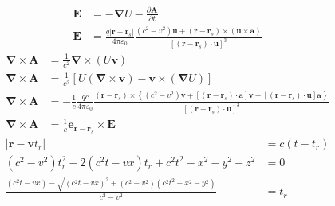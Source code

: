 \begin{align}
    \boldsymbol{E}&=-\boldsymbol{\nabla}U-\frac{\partial\boldsymbol{A}}{\partial t}\nonumber\\
    \boldsymbol{E}&=\frac{q\left|\boldsymbol{r}-\boldsymbol{r}_s\right|}{4\pi\varepsilon_0} \frac{\left(c^2-v^2\right)\boldsymbol{u}+\left(\boldsymbol{r}-\boldsymbol{r}_s\right)\times\left(\boldsymbol{u}\times\boldsymbol{a}\right)}{\left[(\boldsymbol{r}-\boldsymbol{r}_s)\cdot\boldsymbol{u}\right]^3}\label{eq:LW_E_radiation}
\end{align}
\begin{align}
    \boldsymbol{\nabla}\times\boldsymbol{A}&=\frac{1}{c^2}\boldsymbol{\nabla}\times(U\boldsymbol{v})\nonumber\\
    \boldsymbol{\nabla}\times\boldsymbol{A}&=\frac{1}{c^2}\left[U(\boldsymbol{\nabla}\times\boldsymbol{v})-\boldsymbol{v}\times(\boldsymbol{\nabla}U)\right]\nonumber\\
    \boldsymbol{\nabla}\times\boldsymbol{A}&=-\frac{1}{c}\frac{qc}{4\pi\varepsilon_0} \frac{(\boldsymbol{r}-\boldsymbol{r}_s)\times\left\{(c^2-v^2)\boldsymbol{v}+[(\boldsymbol{r}-\boldsymbol{r}_s)\cdot\boldsymbol{a}]\boldsymbol{v}+[(\boldsymbol{r}-\boldsymbol{r}_s)\cdot\boldsymbol{u}]\boldsymbol{a}\right\}}{\left[(\boldsymbol{r}-\boldsymbol{r}_s)\cdot\boldsymbol{u}\right]^3}\\
    \boldsymbol{\nabla}\times\boldsymbol{A}&=\frac{1}{c}\boldsymbol{e}_{\boldsymbol{r}-\boldsymbol{r}_s}\times\boldsymbol{E}
\end{align}
\begin{align*}
    |\boldsymbol{r}-\boldsymbol{v}t_r| &= c(t-t_r)\\
    (c^2 - v^2)t_r^2 - 2(c^2t-vx)t_r +c^2t^2-x^2- y^2 - z^2 &= 0\\
    \frac{(c^2t-vx)- \sqrt{(c^2t-vx)^2+(c^2 - v^2)\left( c^2t^2-x^2- y^2\right) }}{c^2 - v^2}&=t_r
\end{align*}
